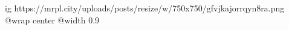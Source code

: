  
 
 
 
 

\ifcmt
  ig https://mrpl.city/uploads/posts/resize/w/750x750/gfvjkajorrqyn8ra.png
  @wrap center
  @width 0.9
\fi
